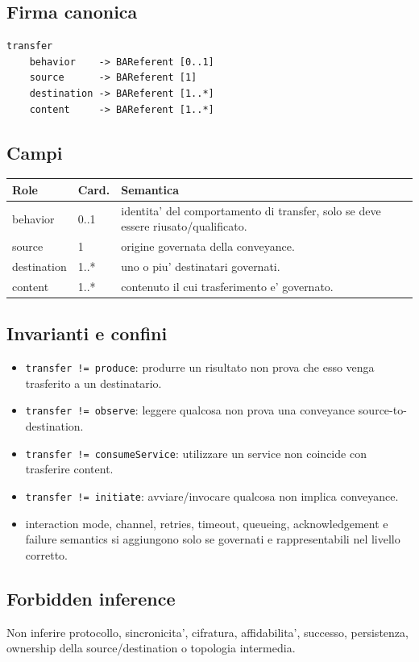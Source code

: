 \documentclass[11pt,a4paper]{article}
\begin{document}
\subsection{Firma canonica}
\begin{lstlisting}
transfer
    behavior    -> BAReferent [0..1]
    source      -> BAReferent [1]
    destination -> BAReferent [1..*]
    content     -> BAReferent [1..*]
\end{lstlisting}

\subsection{Campi}
\begin{tabularx}{\textwidth}{L{36mm}L{24mm}Y}
\toprule
\textbf{Role} & \textbf{Card.} & \textbf{Semantica} \\
\midrule
behavior & 0..1 & identita' del comportamento di transfer, solo se deve essere riusato/qualificato. \\
source & 1 & origine governata della conveyance. \\
destination & 1..* & uno o piu' destinatari governati. \\
content & 1..* & contenuto il cui trasferimento e' governato. \\
\bottomrule
\end{tabularx}

\subsection{Invarianti e confini}
\begin{itemize}
  \item \texttt{transfer != produce}: produrre un risultato non prova che esso venga trasferito a un destinatario.
  \item \texttt{transfer != observe}: leggere qualcosa non prova una conveyance source-to-destination.
  \item \texttt{transfer != consumeService}: utilizzare un service non coincide con trasferire content.
  \item \texttt{transfer != initiate}: avviare/invocare qualcosa non implica conveyance.
  \item interaction mode, channel, retries, timeout, queueing, acknowledgement e failure semantics si aggiungono solo se governati e rappresentabili nel livello corretto.
\end{itemize}

\subsection{Forbidden inference}
Non inferire protocollo, sincronicita', cifratura, affidabilita', successo, persistenza, ownership della source/destination o topologia intermedia.
\end{document}
